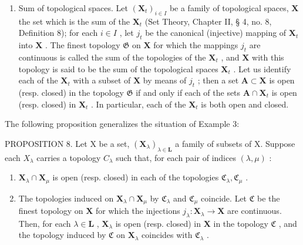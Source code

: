 \begin{enumerate}
\def\labelenumi{\arabic{enumi})}
\setcounter{enumi}{2}
\tightlist
\item
  Sum of topological spaces. Let \((\mathbf{X}_t)_{i \in I}\) be a family of topological spaces, \(\mathbf{X}\) the set which is the sum of the \(\mathbf{X}_t\) (Set Theory, Chapter II, § 4, no. 8, Definition 8); for each \(i \in I\) , let \(j_t\) be the canonical (injective) mapping of \(\mathbf{X}_t\) into \(\mathbf{X}\) . The finest topology \(\mathfrak{G}\) on \(\mathbf{X}\) for which the mappings \(j_t\) are continuous is called the sum of the topologies of the \(\mathbf{X}_t\) , and \(\mathbf{X}\) with this topology is said to be the sum of the topological spaces \(\mathbf{X}_t\) . Let us identify each of the \(\mathbf{X}_t\) with a subset of \(\mathbf{X}\) by means of \(j_t\) ; then a set \(\mathbf{A} \subset \mathbf{X}\) is open (resp. closed) in the topology \(\mathfrak{G}\) if and only if each of the sets \(\mathbf{A} \cap \mathbf{X}_t\) is open (resp. closed) in \(\mathbf{X}_t\) . In particular, each of the \(\mathbf{X}_t\) is both open and closed.
\end{enumerate}

The following proposition generalizes the situation of Example 3:

PROPOSITION 8. Let X be a set, \((\mathbf{X}_{\lambda})_{\lambda \in \mathbf{L}}\) a family of subsets of X. Suppose each \(X_{\lambda}\) carries a topology \(C_{\lambda}\) such that, for each pair of indices \((\lambda, \mu)\) :

\begin{enumerate}
\def\labelenumi{\arabic{enumi})}
\item
  \(\mathbf{X}_{\lambda} \cap \mathbf{X}_{\mu}\) is open (resp. closed) in each of the topologies \(\mathfrak{C}_{\lambda}, \mathfrak{C}_{\mu}\) .
\item
  The topologies induced on \(\mathbf{X}_{\lambda} \cap \mathbf{X}_{\mu}\) by \(\mathfrak{C}_{\lambda}\) and \(\mathfrak{C}_{\mu}\) coincide. Let \(\mathfrak{C}\) be the finest topology on \(\mathbf{X}\) for which the injections \(j_{\lambda}: \mathbf{X}_{\lambda} \to \mathbf{X}\) are continuous. Then, for each \(\lambda \in \mathbf{L}\) , \(\mathbf{X}_{\lambda}\) is open (resp. closed) in \(\mathbf{X}\) in the topology \(\mathfrak{C}\) , and the topology induced by \(\mathfrak{C}\) on \(\mathbf{X}_{\lambda}\) coincides with \(\mathfrak{C}_{\lambda}\) .
\end{enumerate}

